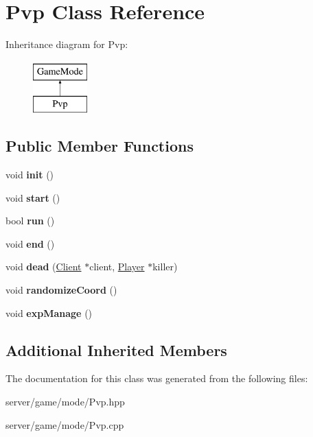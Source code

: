 \hypertarget{class_pvp}{\section{Pvp Class Reference}
\label{class_pvp}
}
Inheritance diagram for Pvp\-:\begin{figure}[H]
\begin{center}
\leavevmode
\includegraphics[height=2.000000cm]{class_pvp}
\end{center}
\end{figure}
\subsection*{Public Member Functions}
\begin{DoxyCompactItemize}
\item 
\hypertarget{class_pvp_afb3c70217d6931ca43d5fe77e58fa1ba}{void {\bfseries init} ()}\label{class_pvp_afb3c70217d6931ca43d5fe77e58fa1ba}

\item 
\hypertarget{class_pvp_a5fbf02b9a43b54c3ff97883108a0ad68}{void {\bfseries start} ()}\label{class_pvp_a5fbf02b9a43b54c3ff97883108a0ad68}

\item 
\hypertarget{class_pvp_a003dce93bf762614332812364b51d035}{bool {\bfseries run} ()}\label{class_pvp_a003dce93bf762614332812364b51d035}

\item 
\hypertarget{class_pvp_af8aa8791b1a28812b0acb54dccedca28}{void {\bfseries end} ()}\label{class_pvp_af8aa8791b1a28812b0acb54dccedca28}

\item 
\hypertarget{class_pvp_af74b12acf8e6b025155a6ecb5c8d49d2}{void {\bfseries dead} (\hyperlink{class_client}{Client} $\ast$client, \hyperlink{class_player}{Player} $\ast$killer)}\label{class_pvp_af74b12acf8e6b025155a6ecb5c8d49d2}

\item 
\hypertarget{class_pvp_a3626d997d4b0dd4cfdbe9606d701754f}{void {\bfseries randomize\-Coord} ()}\label{class_pvp_a3626d997d4b0dd4cfdbe9606d701754f}

\item 
\hypertarget{class_pvp_a32a396e8fe9f79863e2d1b1ec5662861}{void {\bfseries exp\-Manage} ()}\label{class_pvp_a32a396e8fe9f79863e2d1b1ec5662861}

\end{DoxyCompactItemize}
\subsection*{Additional Inherited Members}


The documentation for this class was generated from the following files\-:\begin{DoxyCompactItemize}
\item 
server/game/mode/Pvp.\-hpp\item 
server/game/mode/Pvp.\-cpp\end{DoxyCompactItemize}
